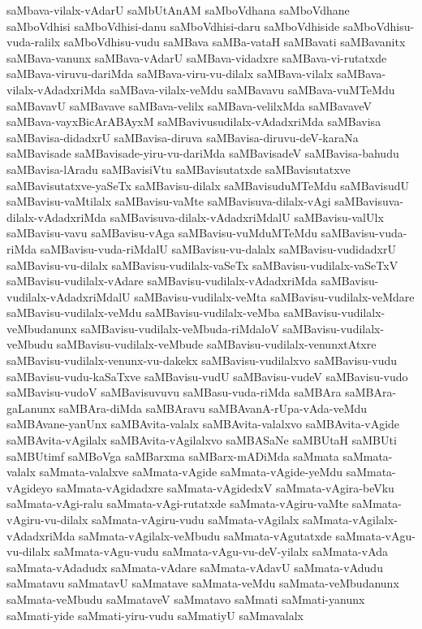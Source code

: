 {saMbava-vilalx-vAdarU
saMbUtAnAM
saMboVdhana
saMboVdhane
saMboVdhisi
saMboVdhisi-danu
saMboVdhisi-daru
saMboVdhiside
saMboVdhisu-vuda-ralilx
saMboVdhisu-vudu
saMBava
saMBa-vataH
saMBavati
saMBavanitx
saMBava-vanunx
saMBava-vAdarU
saMBava-vidadxre
saMBava-vi-rutatxde
saMBava-viruvu-dariMda
saMBava-viru-vu-dilalx
saMBava-vilalx
saMBava-vilalx-vAdadxriMda
saMBava-vilalx-veMdu
saMBavavu
saMBava-vuMTeMdu
saMBavavU
saMBavave
saMBava-velilx
saMBava-velilxMda
saMBavaveV
saMBava-vayxBicArABAyxM
saMBavivusudilalx-vAdadxriMda
saMBavisa
saMBavisa-didadxrU
saMBavisa-diruva
saMBavisa-diruvu-deV-karaNa
saMBavisade
saMBavisade-yiru-vu-dariMda
saMBavisadeV
saMBavisa-bahudu
saMBavisa-lAradu
saMBavisiVtu
saMBavisutatxde
saMBavisutatxve
saMBavisutatxve-yaSeTx
saMBavisu-dilalx
saMBavisuduMTeMdu
saMBavisudU
saMBavisu-vaMtilalx
saMBavisu-vaMte
saMBavisuva-dilalx-vAgi
saMBavisuva-dilalx-vAdadxriMda
saMBavisuva-dilalx-vAdadxriMdalU
saMBavisu-valUlx
saMBavisu-vavu
saMBavisu-vAga
saMBavisu-vuMduMTeMdu
saMBavisu-vuda-riMda
saMBavisu-vuda-riMdalU
saMBavisu-vu-dalalx
saMBavisu-vudidadxrU
saMBavisu-vu-dilalx
saMBavisu-vudilalx-vaSeTx
saMBavisu-vudilalx-vaSeTxV
saMBavisu-vudilalx-vAdare
saMBavisu-vudilalx-vAdadxriMda
saMBavisu-vudilalx-vAdadxriMdalU
saMBavisu-vudilalx-veMta
saMBavisu-vudilalx-veMdare
saMBavisu-vudilalx-veMdu
saMBavisu-vudilalx-veMba
saMBavisu-vudilalx-veMbudanunx
saMBavisu-vudilalx-veMbuda-riMdaloV
saMBavisu-vudilalx-veMbudu
saMBavisu-vudilalx-veMbude
saMBavisu-vudilalx-venunxtAtxre
saMBavisu-vudilalx-venunx-vu-dakekx
saMBavisu-vudilalxvo
saMBavisu-vudu
saMBavisu-vudu-kaSaTxve
saMBavisu-vudU
saMBavisu-vudeV
saMBavisu-vudo
saMBavisu-vudoV
saMBavisuvuvu
saMBasu-vuda-riMda
saMBAra
saMBAra-gaLanunx
saMBAra-diMda
saMBAravu
saMBAvanA-rUpa-vAda-veMdu
saMBAvane-yanUnx
saMBAvita-valalx
saMBAvita-valalxvo
saMBAvita-vAgide
saMBAvita-vAgilalx
saMBAvita-vAgilalxvo
saMBASaNe
saMBUtaH
saMBUti
saMBUtimf
saMBoVga
saMBarxma
saMBarx-mADiMda
saMmata
saMmata-valalx
saMmata-valalxve
saMmata-vAgide
saMmata-vAgide-yeMdu
saMmata-vAgideyo
saMmata-vAgidadxre
saMmata-vAgidedxV
saMmata-vAgira-beVku
saMmata-vAgi-ralu
saMmata-vAgi-rutatxde
saMmata-vAgiru-vaMte
saMmata-vAgiru-vu-dilalx
saMmata-vAgiru-vudu
saMmata-vAgilalx
saMmata-vAgilalx-vAdadxriMda
saMmata-vAgilalx-veMbudu
saMmata-vAgutatxde
saMmata-vAgu-vu-dilalx
saMmata-vAgu-vudu
saMmata-vAgu-vu-deV-yilalx
saMmata-vAda
saMmata-vAdadudx
saMmata-vAdare
saMmata-vAdavU
saMmata-vAdudu
saMmatavu
saMmatavU
saMmatave
saMmata-veMdu
saMmata-veMbudanunx
saMmata-veMbudu
saMmataveV
saMmatavo
saMmati
saMmati-yanunx
saMmati-yide
saMmati-yiru-vudu
saMmatiyU
saMmavalalx
}
